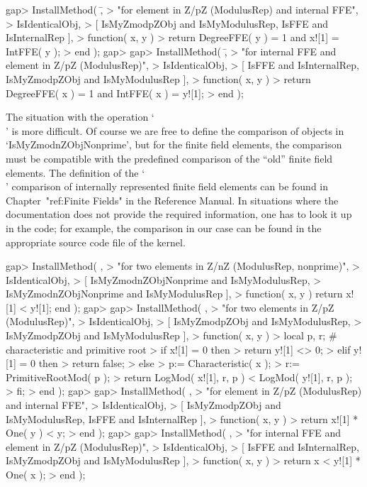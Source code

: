 \beginexample
gap> InstallMethod( \=,
>    "for element in Z/pZ (ModulusRep) and internal FFE",
>    IsIdenticalObj,
>    [ IsMyZmodpZObj and IsMyModulusRep, IsFFE and IsInternalRep ],
>    function( x, y )
>    return DegreeFFE( y ) = 1 and x![1] = IntFFE( y );
>    end );
gap> 
gap> InstallMethod( \=,
>    "for internal FFE and element in Z/pZ (ModulusRep)",
>    IsIdenticalObj,
>    [ IsFFE and IsInternalRep, IsMyZmodpZObj and IsMyModulusRep ],
>    function( x, y )
>    return DegreeFFE( x ) = 1 and IntFFE( x ) = y![1];
>    end );
\endexample

The situation with the operation `\\\<' is more difficult.
Of course we are free to define the comparison of objects in
`IsMyZmodnZObjNonprime',
but for the finite field elements, the comparison must be compatible
with the predefined comparison of the ``old'' finite field elements.
The definition of the `\\\<' comparison of internally represented
finite field elements can be found in Chapter~"ref:Finite Fields"
in the Reference Manual.
In situations where the documentation does not provide the required
information, one has to look it up in the {\GAP} code;
for example, the comparison in our case can be found in the
appropriate source code file of the {\GAP} kernel.

\beginexample
gap> InstallMethod( \<,
>    "for two elements in Z/nZ (ModulusRep, nonprime)",
>    IsIdenticalObj,
>    [ IsMyZmodnZObjNonprime and IsMyModulusRep,
>      IsMyZmodnZObjNonprime and IsMyModulusRep ],
>    function( x, y ) return x![1] < y![1]; end );
gap> 
gap> InstallMethod( \<,
>    "for two elements in Z/pZ (ModulusRep)",
>    IsIdenticalObj,
>    [ IsMyZmodpZObj and IsMyModulusRep,
>      IsMyZmodpZObj and IsMyModulusRep ],
>    function( x, y )
>    local p, r;      # characteristic and primitive root
>    if x![1] = 0 then
>      return y![1] <> 0;
>    elif y![1] = 0 then
>      return false;
>    else
>      p:= Characteristic( x );
>      r:= PrimitiveRootMod( p );
>      return LogMod( x![1], r, p ) < LogMod( y![1], r, p );
>    fi;
>    end );
gap> 
gap> InstallMethod( \<,
>    "for element in Z/pZ (ModulusRep) and internal FFE",
>    IsIdenticalObj,
>    [ IsMyZmodpZObj and IsMyModulusRep, IsFFE and IsInternalRep ],
>    function( x, y )
>    return x![1] * One( y ) < y;
>    end );
gap> 
gap> InstallMethod( \<,
>    "for internal FFE and element in Z/pZ (ModulusRep)",
>    IsIdenticalObj,
>    [ IsFFE and IsInternalRep, IsMyZmodpZObj and IsMyModulusRep ],
>    function( x, y )
>    return x < y![1] * One( x );
>    end );
\endexample

